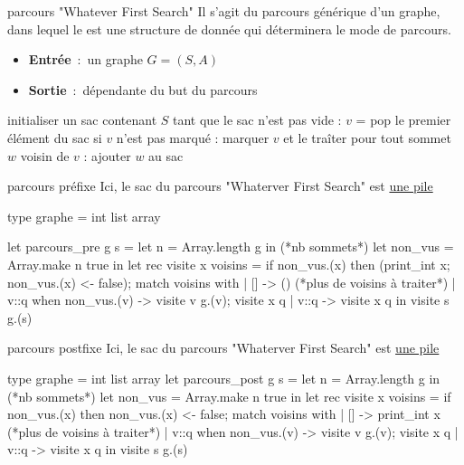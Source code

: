 

\begin{adjustwidth}{-3cm}{-3cm}


\begin{implementation}{3.1}{parcours "Whatever First Search"}
    Il s'agit du parcours générique d'un graphe, dans lequel le  est une structure de donnée qui déterminera le mode de parcours.
    \begin{itemize}
        \item \textbf{Entrée}~:~un graphe $G = (S,A)$
        \item \textbf{Sortie}~:~dépendante du but du parcours
    \end{itemize}
    \begin{lstLNat}
    initialiser un sac contenant $S$
    tant que le sac n'est pas vide :
        $v$ = pop le premier élément du sac
        si $v$ n'est pas marqué :
            marquer $v$ et le traîter
            pour tout sommet $w$ voisin de $v$ :
                ajouter $w$ au sac
    \end{lstLNat}
\end{implementation}

\begin{implementation}{3.2}{parcours préfixe}
    Ici, le sac du parcours "Whaterver First Search" est \underline{une pile}
    \begin{lstOCaml}
    type graphe = int list array

    let parcours_pre g s =
    let n = Array.length g in (*nb sommets*)
    let non_vus = Array.make n true in
    let rec visite x voisins = 
        if non_vus.(x) then
            (print_int x;
            non_vus.(x) <- false);
        match voisins with
        | [] -> () (*plus de voisins à traiter*)
        | v::q when non_vus.(v) ->
            visite v g.(v);
            visite x q
        | v::q -> visite x q
    in visite s g.(s)
    \end{lstOCaml}
\end{implementation}

\begin{implementation}{3.3}{parcours postfixe}
    Ici, le sac du parcours "Whaterver First Search" est \underline{une pile}
    \begin{lstOCaml}
    type graphe = int list array
    let parcours_post g s =
    let n = Array.length g in (*nb sommets*)
    let non_vus = Array.make n true in
    let rec visite x voisins = 
        if non_vus.(x) then 
            non_vus.(x) <- false;
        match voisins with
        | [] -> print_int x (*plus de voisins à traiter*)
        | v::q when non_vus.(v) ->
            visite v g.(v);
            visite x q
        | v::q -> visite x q
    in visite s g.(s)
    \end{lstOCaml}
\end{implementation}


\end{adjustwidth}
